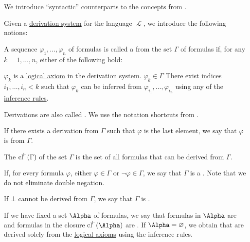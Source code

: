 \begin{definition}\label{def:first_order_proofs}
  We introduce \enquote{syntactic} counterparts to the concepts from .

  Given a \hyperref[def:first_order_derivation_system]{derivation system} for the language \( \mscrL \), we introduce the following notions:
  \begin{defenum}
    A sequence \( \varphi_1, \ldots, \varphi_n \) of formulas is called a  from the set \( \Gamma \) of formulas if, for any \( k = 1, \ldots, n \), either of the following hold:
    \begin{defenum}
       \( \varphi_k \) is a \hyperref[def:first_order_derivation_system/axioms]{logical axiom} in the derivation system.
       \( \varphi_k \in \Gamma \)
       There exist indices \( i_1, \ldots, i_n < k \) such that \( \varphi_k \) can be inferred from \( \varphi_{i_1}, \ldots, \varphi_{i_n} \) using any of the \hyperref[def:first_order_derivation_system/rules]{inference rules}.
    \end{defenum}

    Derivations are also called . We use the notation shortcuts from .

     If there exists a derivation from \( \Gamma \) such that \( \varphi \) is the last element, we say that \( \varphi \) is  from \( \Gamma \).

     The  \( \operatorname{cl}^{\vdash}(\Gamma) \) of the set \( \Gamma \) is the set of all formulas that can be derived from \( \Gamma \).

    If, for every formula \( \varphi \), either \( \varphi \in \Gamma \) or \( \neg \varphi \in \Gamma \), we say that \( \Gamma \) is a . Note that we do not eliminate double negation.

    If \( \bot \) cannot be derived from \( \Gamma \), we say that \( \Gamma \) is .

     If we have fixed a set \( \Alpha \) of formulas, we say that formulas in \( \Alpha \) are  and formulas in the closure \( \cl^{\vdash}(\Alpha) \) are . If \( \Alpha = \varnothing \), we obtain  that are derived solely from the \hyperref[def:first_order_derivation_system/axioms]{logical axioms} using the inference rules.
  \end{defenum}
\end{definition}

